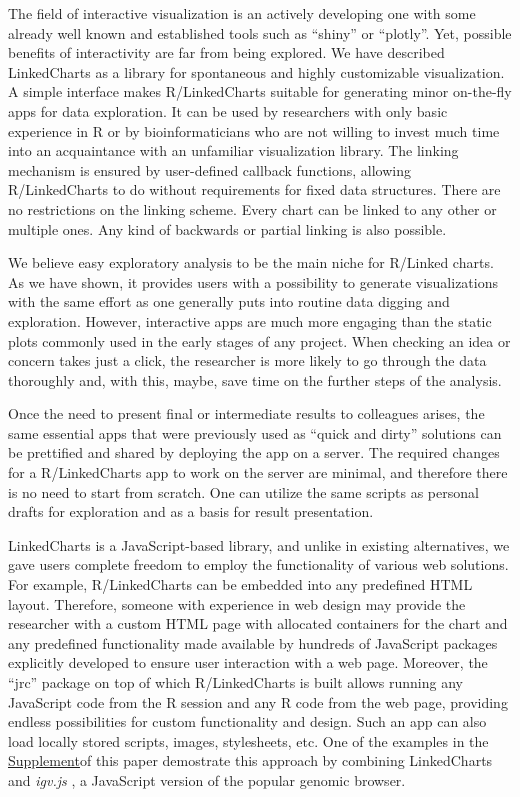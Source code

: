 \documentclass[twocolumn,10pt]{article}
\newcommand{\Supplement}{\href{https://anders-biostat.github.io/lc-paper/}{Supplement}}
\begin{document}
The field of interactive visualization is an actively developing one with some already well known and established tools such as ``shiny'' \citep{shiny} or ``plotly''\citep{sievert_2020}. Yet, possible benefits of interactivity are far from being explored. We have described LinkedCharts as a library for spontaneous and highly customizable visualization. A simple interface makes R/LinkedCharts suitable for generating minor on-the-fly apps for data exploration. It can be used by researchers with only basic experience in R or by bioinformaticians who are not willing to invest much time into an acquaintance with an unfamiliar visualization library. The linking mechanism is ensured by user-defined callback functions, allowing R/LinkedCharts to do without requirements for fixed data structures. There are no restrictions on the linking scheme. Every chart can be linked to any other or multiple ones. Any kind of backwards or partial linking is also possible.

We believe easy exploratory analysis to be the main niche for R/Linked charts. As we have shown, it provides users with a possibility to generate visualizations with the same effort as one generally puts into routine data digging and exploration. However, interactive apps are much more engaging than the static plots commonly used in the early stages of any project. When checking an idea or concern takes just a click, the researcher is more likely to go through the data thoroughly and, with this, maybe, save time on the further steps of the analysis.

Once the need to present final or intermediate results to colleagues arises, the same essential apps that were previously used as ``quick and dirty'' solutions can be prettified and shared by deploying the app on a server. The required changes for a R/LinkedCharts app to work on the server are minimal, and therefore there is no need to start from scratch. One can utilize the same scripts as personal drafts for exploration and as a basis for result presentation.

LinkedCharts is a JavaScript-based library, and unlike in existing alternatives, we gave users complete freedom to employ the functionality of various web solutions. For example, R/LinkedCharts can be embedded into any predefined HTML layout. Therefore, someone with experience in web design may provide the researcher with a custom HTML page with allocated containers for the chart and any predefined functionality made available by hundreds of JavaScript packages explicitly developed to ensure user interaction with a web page. Moreover, the ``jrc'' package on top of which R/LinkedCharts is built allows running any JavaScript code from the R session and any R code from the web page, providing endless possibilities for custom functionality and design. Such an app can also load locally stored scripts, images, stylesheets, etc. One of the examples in the \Supplement of this paper demostrate this approach by combining LinkedCharts and \emph{igv.js} \citep{robinson_2023}, a JavaScript version of the popular genomic browser. 
\end{document}
